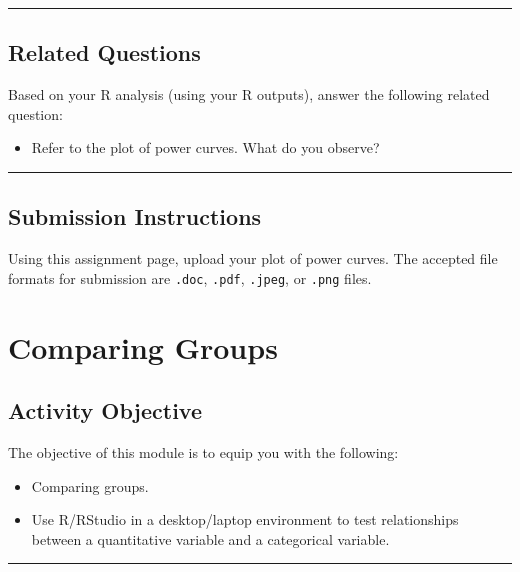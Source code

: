 \documentclass[oneside,openany]{book}
\providecommand{\tightlist}{%
  \setlength{\itemsep}{0pt}\setlength{\parskip}{0pt}}
\begin{document}
\begin{center}\rule{0.5\linewidth}{0.5pt}\end{center}

\section{Related Questions}\label{related-questions-6}

Based on your R analysis (using your R outputs), answer the following related question:

\begin{itemize}
\tightlist
\item
  Refer to the plot of power curves. What do you observe?
\end{itemize}

\begin{center}\rule{0.5\linewidth}{0.5pt}\end{center}

\section{Submission Instructions}\label{submission-instructions}

Using this assignment page, upload your plot of power curves. The accepted file formats for  submission are \texttt{.doc}, \texttt{.pdf}, \texttt{.jpeg}, or \texttt{.png} files.

\chapter{Comparing Groups}\label{activity-8---comparing-groups}

\section{Activity Objective}\label{activity-objective-5}

The objective of this module is to equip you with the following:
\begin{itemize}
    \item Comparing groups.
    \item Use R/RStudio in a desktop/laptop environment to test relationships between a quantitative variable and a categorical variable.
\end{itemize}


\begin{center}\rule{0.5\linewidth}{0.5pt}\end{center}
\end{document}
